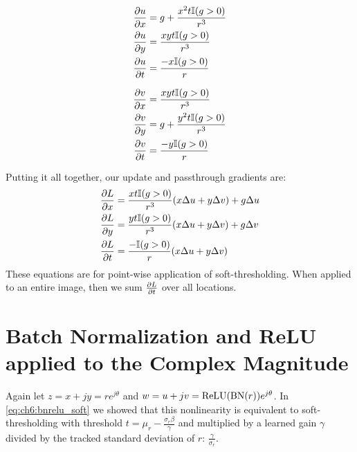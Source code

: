 \begin{minipage}{.48\linewidth}
\begin{align}
  \frac{\partial u}{\partial x} &= g + \frac{x^2t\mathbb{I}(g > 0)}{r^3} \\
  \frac{\partial u}{\partial y} &= \frac{xyt\mathbb{I}(g > 0)}{r^3} \\
  \frac{\partial u}{\partial t} &= \frac{-x\mathbb{I}(g > 0)}{r}
\end{align}
\vspace{5pt}
\end{minipage}
\begin{minipage}{.48\linewidth}
\begin{align}
  \frac{\partial v}{\partial x} &= \frac{xyt\mathbb{I}(g > 0)}{r^3} \\
  \frac{\partial v}{\partial y} &=g + \frac{y^2t\mathbb{I}(g > 0)}{r^3} \\
  \frac{\partial v}{\partial t} &= \frac{-y\mathbb{I}(g > 0)}{r}
\end{align}
\vspace{5pt}
\end{minipage}
Putting it all together, our update and passthrough gradients are:
\begin{align}
  \frac{\partial L}{\partial x} &= \frac{xt\mathbb{I}(g>0)}{r^3}(x\Delta u + y\Delta v) + g\Delta u \label{eq:appE:softx}\\
  \frac{\partial L}{\partial y} &= \frac{yt\mathbb{I}(g>0)}{r^3}(x\Delta u + y\Delta v) + g\Delta v \label{eq:appE:softy}\\
  \frac{\partial L}{\partial t} &= \frac{-\mathbb{I}(g > 0)}{r} (x\Delta u + y\Delta v) \label{eq:appE:softt}
\end{align}
These equations are for point-wise application of soft-thresholding. When
applied to an entire image, then we sum $\frac{\partial L}{\partial t}$ over all locations.

\section{Batch Normalization and ReLU applied to the Complex Magnitude}\label{sec:appE:bnrelu}
Again let $z= x+jy = re^{j\theta}$ and $w=u + jv = \mathrm{ReLU}(\mathrm{BN}(r))e^{j\theta}$. 
In \eqref{eq:ch6:bnrelu_soft} we showed that this nonlinearity is equivalent to
soft-thresholding with threshold $t= \mu_r - \frac{\sigma_r\beta}{\gamma}$ and
multiplied by a learned gain $\gamma$ divided by the tracked standard deviation of 
$r$: $\frac{\gamma}{\sigma_r}$. 

